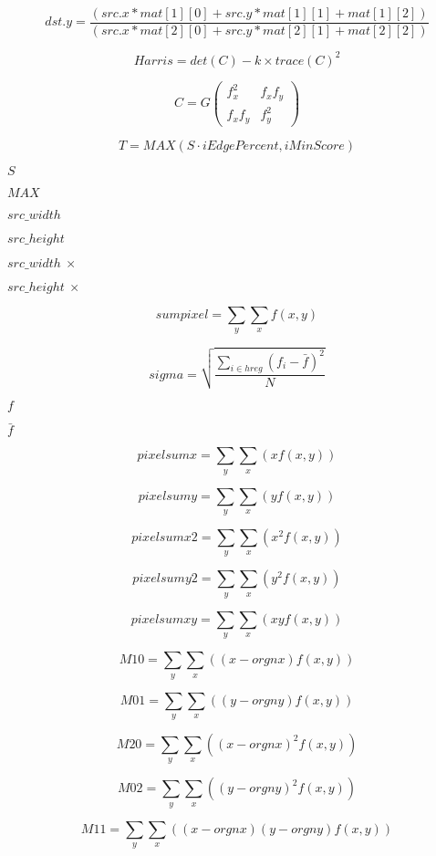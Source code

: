 \documentclass{article}
\begin{document}
{\[ dst.y = \frac{\left( src.x * mat\left[ 1 \right]\left[ 0 \right] + src.y * mat\left[ 1 \right]\left[ 1 \right] + mat\left[ 1 \right]\left[ 2 \right] \right)} {\left( src.x * mat\left[ 2 \right]\left[ 0 \right] + src.y * mat\left[ 2 \right]\left[ 1 \right] + mat\left[ 2 \right]\left[ 2 \right] \right)} \]
\pagebreak

\[ Harris = det(C) - k \times trace(C)^2 \]
\pagebreak

\[ C = G \left( \begin{array}{cc} f_{x}^2 & f_{x}f_{y} \\ f_{x}f_{y} & f_{y}^2 \end{array} \right) \]
\pagebreak

\[ T = MAX( S \cdot iEdgePercent, iMinScore ) \]
\pagebreak

$S$
\pagebreak

$MAX$
\pagebreak

$src\_width$
\pagebreak

$src\_height$
\pagebreak

$src\_width ~\times$
\pagebreak

$src\_height ~\times$
\pagebreak

\[sumpixel = \sum_{y}\sum_{x}{f(x,y)} \]
\pagebreak

\[sigma = \sqrt{ \frac{ \sum_{i \in hreg}\left(f_i - \bar{f}\right)^2 }{N} } \]
\pagebreak

$ f $
\pagebreak

$ \bar{f} $
\pagebreak

\[pixelsumx = \sum_{y}\sum_{x}{\left(x f(x,y)\right)} \]
\pagebreak

\[pixelsumy = \sum_{y}\sum_{x}{\left(y f(x,y)\right)} \]
\pagebreak

\[pixelsumx2 = \sum_{y}\sum_{x}{\left(x^2 f(x,y)\right)} \]
\pagebreak

\[pixelsumy2 = \sum_{y}\sum_{x}{\left(y^2 f(x,y)\right)} \]
\pagebreak

\[pixelsumxy = \sum_{y}\sum_{x}{\left(x y f(x,y)\right)} \]
\pagebreak

\[M10 = \sum_{y}\sum_{x}{\left((x-orgnx) f(x,y)\right)} \]
\pagebreak

\[M01 = \sum_{y}\sum_{x}{\left((y-orgny) f(x,y)\right)} \]
\pagebreak

\[M20 = \sum_{y}\sum_{x}{\left((x-orgnx)^2 f(x,y)\right)} \]
\pagebreak

\[M02 = \sum_{y}\sum_{x}{\left((y-orgny)^2 f(x,y)\right)} \]
\pagebreak

\[M11 = \sum_{y}\sum_{x}{\left((x-orgnx)(y-orgny) f(x,y)\right)} \]
\pagebreak

}
\end{document}
